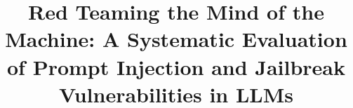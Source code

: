 \documentclass[conference]{IEEEtran}
\begin{document}
\title{Red Teaming the Mind of the Machine: A Systematic Evaluation of Prompt Injection and Jailbreak Vulnerabilities in LLMs}


\author{
}

\maketitle
\end{document}
